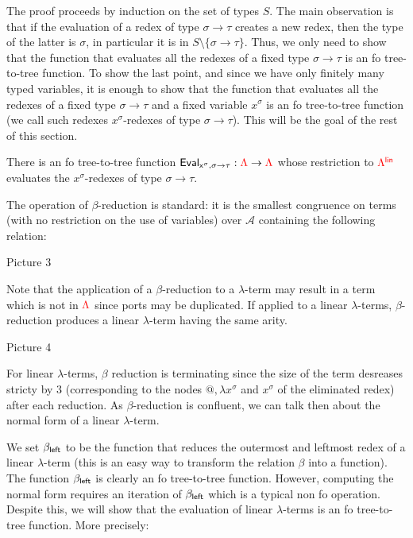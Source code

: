 The proof proceeds by induction on the set of types $S$. The main observation is that if the evaluation of a redex of type $\sigma\rightarrow \tau$ creates a new redex, then the type of the latter is $\sigma$, in particular it is in $S\setminus\{\sigma\rightarrow\tau\}$. Thus, we only need to show that the function that evaluates all the redexes of a fixed type $\sigma\rightarrow\tau$ is an fo tree-to-tree function.  To show the last point, and since we have only finitely many typed variables, it is enough to show that the function that evaluates all the redexes of a fixed type $\sigma\rightarrow\tau$ and a fixed variable $x^\sigma$ is an fo tree-to-tree function (we call such redexes $x^\sigma$-redexes of type $\sigma\rightarrow\tau$). This will be the goal of the rest of this section. 

\begin{theorem}\label{thm:evalOneType}
There is an fo tree-to-tree function ${\sf{Eval}_{x^\sigma,\sigma\rightarrow\tau}}:{\color{red}{\Lambda}} \to{\color{red}{\Lambda}}$ whose restriction to ${\color{red}{\Lambda^{\sf{lin}}}}$ evaluates the  $x^\sigma$-redexes of type $\sigma\rightarrow\tau$.
\end{theorem}





 The operation of $\beta$-reduction is standard: it is the smallest congruence on terms (with no restriction on the use of variables) over $\mathcal{A}$ containing the following relation:
 \begin{center}
 Picture 3
 \end{center}
Note that the application of a $\beta$-reduction to a $\lambda$-term may result in a term which is not in ${\color{red}{\Lambda}}$ since ports may be duplicated. If applied to a linear $\lambda$-terms, $\beta$-reduction produces a linear $\lambda$-term having the same arity. 
\begin{center}
Picture 4
\end{center}

\medskip
For linear $\lambda$-terms, $\beta$ reduction is terminating since the size of the term desreases stricty by 3 (corresponding to the nodes $\text{@}, \lambda x^\sigma$ and $x^\sigma$ of the eliminated redex) after each reduction. As $\beta$-reduction is confluent, we can talk then about the normal form of a linear $\lambda$-term.

\medskip
We set $\beta_{\sf{left}}$ to be the function that reduces the outermost and leftmost redex of a linear $\lambda$-term (this is an easy way to transform the relation $\beta$ into a function). The function $\beta_{\sf{left}}$  is clearly an fo tree-to-tree function. However, computing the normal form requires an iteration of $\beta_{\sf{left}}$ which is a typical non fo operation. Despite this, we will show that the evaluation of linear $\lambda$-terms is an fo tree-to-tree function. More precisely:


